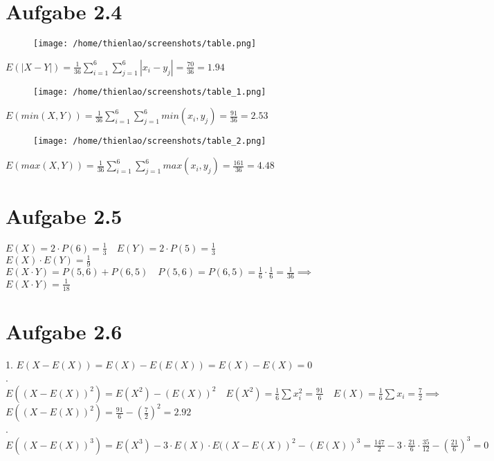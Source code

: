 \documentclass{article}
\begin{document}
	\section*{Aufgabe 2.4}
	\begin{figure} [h]
		\texttt{[image: /home/thienlao/screenshots/table.png]}
	\end{figure}
	\vspace{5pt}	 	
	$E(|X-Y|) = \frac{1}{36} \sum_{i=1}^{6}\sum_{j=1}^{6}|x_{i} - y_{j}| = \frac{70}{36} = 1.94$ \\
	
	\begin{figure} [h]
		\texttt{[image: /home/thienlao/screenshots/table\_1.png]}
	\end{figure} 
	\vspace{5pt}
	$E(min(X,Y)) =  \frac{1}{36} \sum_{i=1}^{6}\sum_{j=1}^{6}min(x_{i},y_{j}) = \frac{91}{36} = 2.53 $ \\ 
	
	\begin{figure} [h]
		\texttt{[image: /home/thienlao/screenshots/table\_2.png]}
	\end{figure} 
	\vspace{5pt}
	$E(max(X,Y)) =  \frac{1}{36} \sum_{i=1}^{6}\sum_{j=1}^{6}max(x_{i},y_{j}) = \frac{161}{36} = 4.48$ 
	
	\section*{Aufgabe 2.5}
	$E(X) = 2 \cdot P(6) = \frac{1}{3} \quad E(Y) = 2 \cdot P(5) = \frac{1}{3}$ \\
	\newline
	$E(X) \cdot E(Y) = \frac{1}{9}$ \\
	\newline
	$E(X \cdot Y) = P(5,6) + P(6,5) \quad P(5,6) = P(6,5) = \frac{1}{6} \cdot \frac{1}{6} = \frac{1}{36} \implies $ \\
	\newline
	$E(X \cdot Y) = \frac{1}{18}$
	
	\section*{Aufgabe 2.6}
	1. $E(X - E(X)) =  E(X) - E(E(X)) = E(X) - E(X) = 0$ \\
	. $E((X - E(X))^2) = E(X^2) - (E(X))^2 \quad E(X^2) = \frac{1}{6}\sum x_{i}^2 = \frac{91}{6} \quad E(X) = \frac{1}{6}\sum x_{i} = \frac{7}{2} \implies $ \\
	\newline 
	$E((X - E(X))^2) = \frac{91}{6} - (\frac{7}{2})^2 = 2.92$ \\
	. $E((X - E(X))^3) = E(X^3) -3 \cdot E(X) \cdot E((X-E(X))^2 - (E(X))^3= \frac{147}{2} - 3 \cdot \frac{21}{6} \cdot \frac{35}{12} - (\frac{21}{6})^3=0$
	\pagebreak
	
\end{document}
